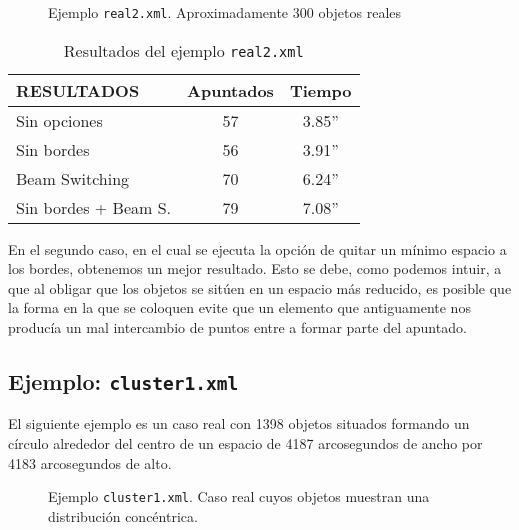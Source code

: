 \begin{figure}[!htb]
\centering
{}
\caption{Ejemplo \texttt{real2.xml}. Aproximadamente 300 objetos reales}
\end{figure}

\begin{table*}[!ht]
\centering
\begin{tabular}{||l||c|c||}
\hline
\hline
RESULTADOS & Apuntados & Tiempo \\
\hline
\hline
Sin opciones & 57 & 3.85'' \\
\hline
Sin bordes & 56 & 3.91'' \\
\hline
Beam Switching & 70 & 6.24'' \\
\hline
Sin bordes + Beam S. & 79& 7.08'' \\
\hline
\hline
\end{tabular}
\caption{Resultados del ejemplo \texttt{real2.xml}}
\end{table*}

En el segundo caso, en el cual se ejecuta la opción de quitar un mínimo espacio
a los bordes, obtenemos un mejor resultado. Esto se debe, como podemos intuir,
a que al obligar que los objetos se sitúen en un espacio más reducido, es
posible que la forma en la que se coloquen evite que un elemento que
antiguamente nos producía un mal intercambio de puntos entre a formar parte del
apuntado.

\subsection {Ejemplo: \texttt{cluster1.xml}}
El siguiente ejemplo es un caso real con 1398 objetos situados formando un
círculo alrededor del centro de un espacio de 4187 arcosegundos de ancho por
4183 arcosegundos de alto.

\begin{figure}[!htb]
\centering
{}
\caption{Ejemplo \texttt{cluster1.xml}. Caso real cuyos objetos muestran una distribución concéntrica.}
\end{figure}

